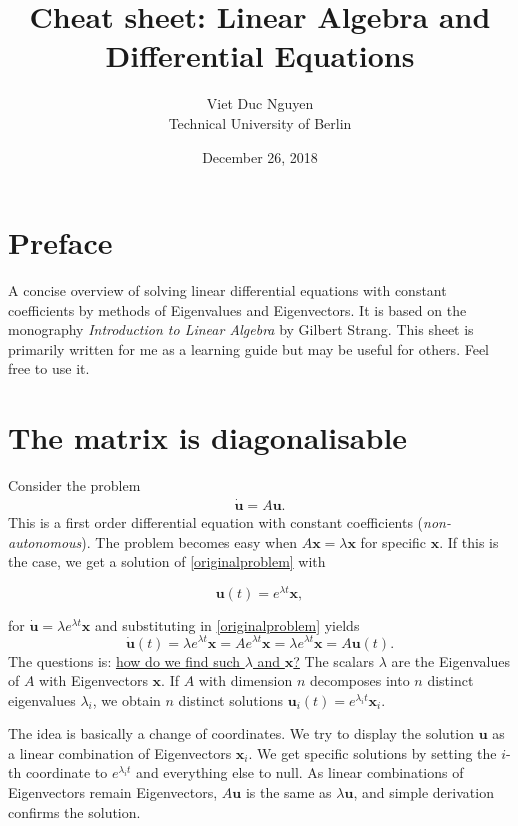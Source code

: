 \documentclass[a4paper, 11pt]{article}
\theoremstyle{plain}
\theoremstyle{definition}
\begin{document}
\title{Cheat sheet: Linear Algebra and Differential Equations}
\author{Viet Duc Nguyen\\ Technical University of Berlin}
\date{December 26, 2018}
\maketitle
\tableofcontents

\setcounter{section}{-1}
\section{Preface}
A concise overview of solving linear differential equations with constant coefficients by methods of Eigenvalues and Eigenvectors. It is based on the monography \textit{Introduction to Linear Algebra} by Gilbert Strang. This sheet is primarily written for me as a learning guide but may be useful for others. Feel free to use it.

\section{The matrix is diagonalisable}
Consider the problem
\begin{align}\label{originalproblem}
	\mathbf{\dot u} = A \mathbf u.
\end{align}
This is a first order differential equation with constant coefficients (\emph{non-autonomous}). The problem becomes easy when $A \mathbf x = \lambda \mathbf x$ for specific $\mathbf x$. If this is the case, we get a solution of \eqref{originalproblem} with
\begin{framed}
\[
	\mathbf u(t) =  e^{\lambda t} \mathbf x,
\] 
\end{framed}
for $\mathbf{\dot u} = \lambda e^{\lambda t} \mathbf x$ and substituting in \eqref{originalproblem} yields
\[
	\mathbf{\dot u}(t) = \lambda e^{\lambda t} \mathbf x = A e^{\lambda t} \mathbf x = \lambda e^{\lambda t} \mathbf x = A \mathbf u(t).
\]
The questions is: \underline{how do we find such $\lambda$ and $\mathbf x$?} The scalars $\lambda$ are the Eigenvalues of $A$ with Eigenvectors $\mathbf x$. If $A$ with dimension $n$ decomposes into $n$ distinct eigenvalues $\lambda_i$, we obtain $n$ distinct solutions $\mathbf u_i(t) = e^{\lambda_it}\mathbf x_i$.

The idea is basically a change of coordinates. We try to display the solution $\mathbf u$ as a linear combination of Eigenvectors $\mathbf x_i$. We get specific solutions by setting the $i$-th coordinate to $e^{\lambda_i t}$ and everything else to null. As linear combinations of Eigenvectors remain Eigenvectors, $A \mathbf u$ is the same as $\lambda \mathbf u$, and simple derivation confirms the solution.
\end{document}
